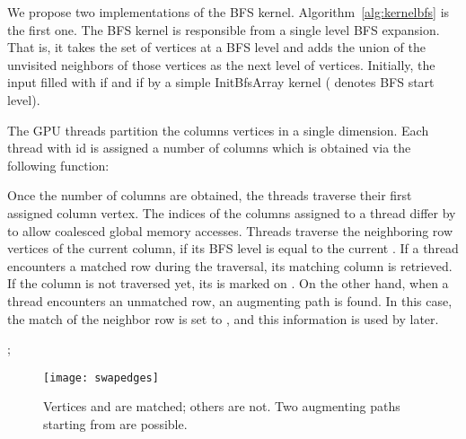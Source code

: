 \documentclass[11pt,a4paper]{article}
\newcommand{\altswap}{{\sc{Alternate}}\xspace}
\begin{document}
We propose two implementations of the BFS kernel. 
Algorithm~\ref{alg:kernelbfs} is the first one. The BFS kernel is 
responsible from a single level BFS expansion. 
That is, it takes the set of vertices at a BFS level and adds the union of the unvisited neighbors of
those vertices as the next level of vertices.
Initially, the input  filled with  if  and  if 
 by a simple {\sc InitBfsArray} kernel ( denotes BFS start level).



 The GPU threads partition the columns vertices in a single dimension. Each thread with id 
 is assigned a number of columns which is obtained 
 via the following function:
 
 
 Once the number of columns are obtained, the threads traverse their 
 first assigned column vertex. The indices of the columns assigned to a thread 
 differ by  to allow coalesced global memory accesses. 
 Threads traverse the neighboring row vertices of the current column, 
 if its BFS level is equal to the current . If a thread encounters
 a matched row during the traversal, its matching column is retrieved. 
 If the column is not traversed yet, its  is marked on . 
 On the other hand, when a thread encounters an unmatched row, 
 an augmenting path is found. In this case, the match of the neighbor 
 row is set to , and this information is used by \altswap later.

\begin{algorithm}
  \small 
  \caption{\altswap}
  \label{alg:kernelswap_edges}
  \KwData{} 

	;\\
\end{algorithm}

\begin{figure} [!htb]
\center
\texttt{[image: swapedges]}
\vspace*{-1ex}
\caption{Vertices  and  are matched; others are not.
Two augmenting paths starting from  are possible.}

 \label{fig:swapedges}
\end{figure}
\end{document}
